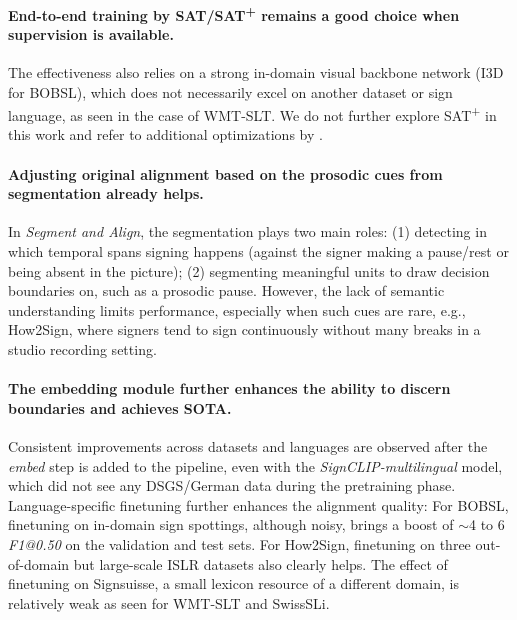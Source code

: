 \documentclass[11pt]{article}
\newcommand{\lili}[1]{{\color{green}[lili: #1]}} %
\begin{document}
\paragraph{End-to-end training by SAT/SAT\textsuperscript{+} remains a good choice when supervision is available.}
The effectiveness also relies on a strong in-domain visual backbone network (I3D for BOBSL), which does not necessarily excel on another dataset or sign language, as seen in the case of WMT-SLT. 
We do not further explore SAT\textsuperscript{+} in this work and refer to additional optimizations by \citet{jang2025deep}.

\paragraph{Adjusting original alignment based on the prosodic cues from segmentation already helps.} 
In \textit{Segment and Align}, the segmentation plays two main roles:
(1) detecting in which temporal spans signing happens (against the signer making a pause/rest or being absent in the picture);
(2) segmenting meaningful units to draw decision boundaries on, such as a prosodic pause.
However, the lack of semantic understanding limits performance, especially when such cues are rare, e.g., How2Sign, where signers tend to sign continuously without many breaks in a studio recording setting. 

\paragraph{The embedding module further enhances the ability to discern boundaries and achieves SOTA.}
Consistent improvements across datasets and languages are observed after the \textit{embed} step is added to the pipeline, even with the \textit{SignCLIP-multilingual} model, which did not see any DSGS/German data during the pretraining phase.
Language-specific finetuning further enhances the alignment quality: 
For BOBSL, finetuning on in-domain sign spottings, although noisy, brings a boost of $\sim$4 to 6 \textit{F1@0.50} on the validation and test sets.
For How2Sign, finetuning on three out-of-domain but large-scale ISLR datasets also clearly helps.
The effect of finetuning on Signsuisse, a small lexicon resource of a different domain, is relatively weak as seen for WMT-SLT and SwissSLi.
\end{document}
